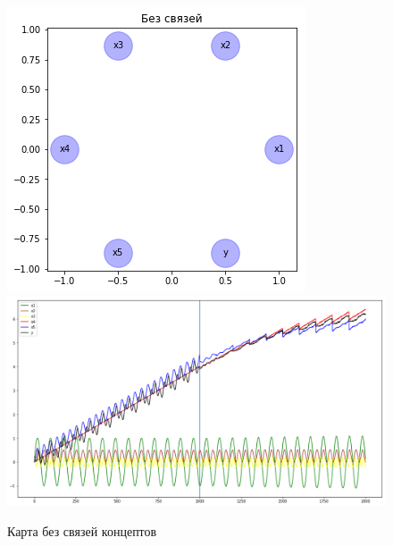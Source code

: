 \def\figurename{Рис}
\begin{figure}[t]
	\centering
	\includegraphics[width=0.7\columnwidth]{./img/lstmfcm_empty.png}
	\includegraphics[width=0.9\columnwidth]{./img/lstmfcm_empty_prediction.png}
	\caption{Карта без связей концептов}
	\label{img:lstmfcm_empty}
\end{figure}

